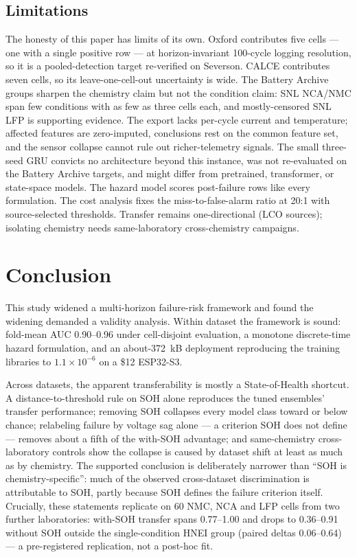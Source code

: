 \documentclass[11pt,a4paper]{article}
\begin{document}
\subsection{Limitations}
The honesty of this paper has limits of its own. Oxford contributes five cells --- one with a single positive row --- at horizon-invariant 100-cycle logging resolution, so it is a pooled-detection target re-verified on Severson. CALCE contributes seven cells, so its leave-one-cell-out uncertainty is wide. The Battery Archive groups sharpen the chemistry claim but not the condition claim: SNL NCA/NMC span few conditions with as few as three cells each, and mostly-censored SNL LFP is supporting evidence. The export lacks per-cycle current and temperature; affected features are zero-imputed, conclusions rest on the common feature set, and the sensor collapse cannot rule out richer-telemetry signals. The small three-seed GRU convicts no architecture beyond this instance, was not re-evaluated on the Battery Archive targets, and might differ from pretrained, transformer, or state-space models. The hazard model scores post-failure rows like every formulation. The cost analysis fixes the miss-to-false-alarm ratio at 20:1 with source-selected thresholds. Transfer remains one-directional (LCO sources); isolating chemistry needs same-laboratory cross-chemistry campaigns.

\section{Conclusion}
This study widened a multi-horizon failure-risk framework and found the widening demanded a validity analysis. Within dataset the framework is sound: fold-mean AUC 0.90--0.96 under cell-disjoint evaluation, a monotone discrete-time hazard formulation, and an about-372~kB deployment reproducing the training libraries to $1.1\times10^{-6}$ on a \$12 ESP32-S3.

Across datasets, the apparent transferability is mostly a State-of-Health shortcut. A distance-to-threshold rule on SOH alone reproduces the tuned ensembles' transfer performance; removing SOH collapses every model class toward or below chance; relabeling failure by voltage sag alone --- a criterion SOH does not define --- removes about a fifth of the with-SOH advantage; and same-chemistry cross-laboratory controls show the collapse is caused by dataset shift at least as much as by chemistry. The supported conclusion is deliberately narrower than ``SOH is chemistry-specific'': much of the observed cross-dataset discrimination is attributable to SOH, partly because SOH defines the failure criterion itself. Crucially, these statements replicate on 60 NMC, NCA and LFP cells from two further laboratories: with-SOH transfer spans 0.77--1.00 and drops to 0.36--0.91 without SOH outside the single-condition HNEI group (paired deltas 0.06--0.64) --- a pre-registered replication, not a post-hoc fit.
\end{document}
